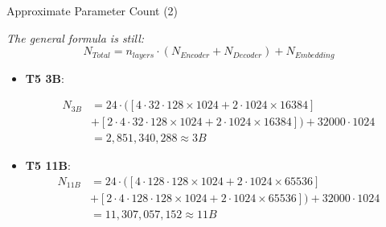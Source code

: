 	\begin{frame}{Approximate Parameter Count (2)}
	
	\textit{The general formula is still:} $$N_{Total} = n_{layers}\cdot (N_{Encoder} + N_{Decoder}) + N_{Embedding}$$
	
	\begin{itemize}
		\item \textbf{T5 3B}: 
	
		$$
		\begin{aligned}
			N_{3B} &= 24\cdot ([4\cdot 32\cdot 128 \times 1024 + 2\cdot 1024 \times 16384] \\
			&+ [2\cdot 4 \cdot 32\cdot 128 \times 1024 + 2\cdot 1024 \times 16384]) + 32000\cdot 1024 \\
			&= 2,851,340,288 \approx 3B
		\end{aligned}
		$$
	
		\hspace{}
	
		\item \textbf{T5 11B}:
		$$
		\begin{aligned}
			N_{11B} &= 24\cdot ([4\cdot 128\cdot 128 \times 1024 + 2\cdot 1024 \times 65536] \\
			&+ [2\cdot 4 \cdot 128\cdot 128 \times 1024 + 2\cdot 1024 \times 65536]) + 32000\cdot 1024 \\
			&= 11,307,057,152 \approx 11B
		\end{aligned}
		$$
	\end{itemize}
		
	\end{frame}
	

\endlecture

